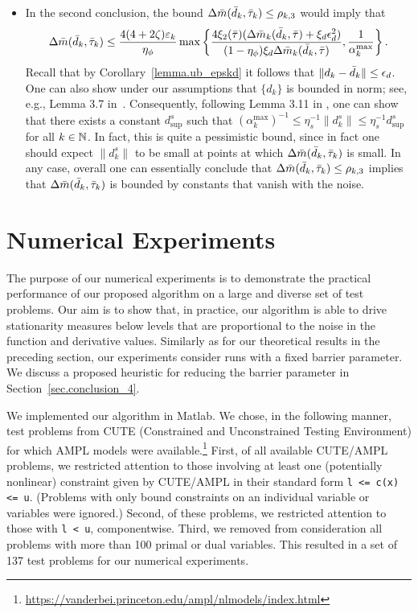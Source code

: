 \begin{itemize}
  \item In the second conclusion, the bound $\Delta {\bar m}({\bar d}_k, {\bar \tau}_k) \leq \rho_{k,3}$ would imply that
  \begin{equation*}
    \Delta {\bar m}({\bar d}_k, {\bar \tau}_k) \leq \frac{4(4 + 2\zeta) \varepsilon_k}{\eta_\phi} \max \left \{ \frac{4 \xi_2({\bar \tau}) (\Delta {\bar m}_k({\bar d}_k, {\bar \tau}) + \xi_d\epsilon_d^2)}{(1 - \eta_\phi) \xi_d \Delta {\bar m}_k({\bar d}_k, {\bar \tau})}, \frac{1}{\alpha_k^{\max}} \right\}.
  \end{equation*}
  Recall that by Corollary~\ref{lemma.ub_epskd} it follows that $\|d_k - {\bar d}_k\| \leq \epsilon_d$.  One can also show under our assumptions that $\{d_k\}$ is bounded in norm; see, e.g., Lemma 3.7 in~\cite{CurtScheWaec10}.  Consequently, following Lemma 3.11 in \cite{CurtScheWaec10}, one can show that there exists a constant $d_{\sup}^s$ such that $(\alpha_k^{\max})^{-1} \leq \eta_s^{-1} \|d_k^s\| \leq \eta_s^{-1} d_{\sup}^s$ for all $k \in \mathbb{N}$.  In fact, this is quite a pessimistic bound, since in fact one should expect $\|d_k^s\|$ to be small at points at which $\Delta {\bar m}({\bar d}_k, {\bar \tau}_k)$ is small.  In any case, overall one can essentially conclude that $\Delta {\bar m}({\bar d}_k, {\bar \tau}_k) \leq \rho_{k,3}$ implies that $\Delta {\bar m}({\bar d}_k, {\bar \tau}_k)$ is bounded by constants that vanish with the noise.
\end{itemize}

\section{Numerical Experiments}\label{sec.numerical_exp}

The purpose of our numerical experiments is to demonstrate the practical performance of our proposed algorithm on a large and diverse set of test problems.  Our aim is to show that, in practice, our algorithm is able to drive stationarity measures below levels that are proportional to the noise in the function and derivative values.  Similarly as for our theoretical results in the preceding section, our experiments consider runs with a fixed barrier parameter.  We discuss a proposed heuristic for reducing the barrier parameter in Section~\ref{sec.conclusion_4}.

We implemented our algorithm in Matlab.  We chose, in the following manner, test problems from CUTE (Constrained and Unconstrained Testing Environment) \cite{bongartz1995cute} for which AMPL models \cite{gay1997hooking} were available.\footnote{\href{https://vanderbei.princeton.edu/ampl/nlmodels/index.html}{https://vanderbei.princeton.edu/ampl/nlmodels/index.html}}  First, of all available CUTE/AMPL problems, we restricted attention to those involving at least one (potentially nonlinear) constraint given by CUTE/AMPL in their standard form \texttt{l <= c(x) <= u}.  (Problems with only bound constraints on an individual variable or variables were ignored.)  Second, of these problems, we restricted attention to those with \texttt{l < u}, componentwise.  Third, we removed from consideration all problems with more than 100 primal or dual variables.  This resulted in a set of 137 test problems for our numerical experiments.

